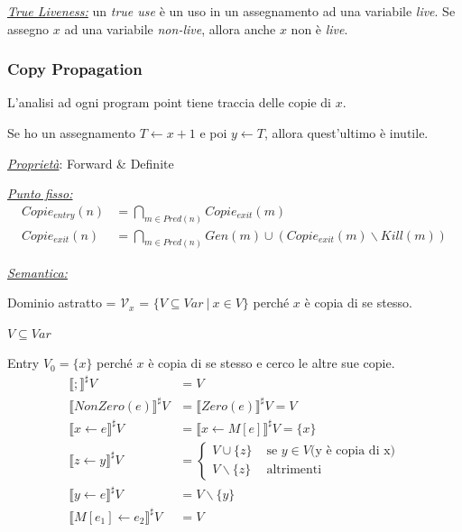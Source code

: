 \documentclass[a4paper, 11pt]{report}
\begin{document}
\noindent
\underline{\textit{True Liveness:}} un \textit{true use} è un uso in un assegnamento ad una variabile \textit{live}. Se assegno $x$ ad una variabile \textit{non-live}, allora anche $x$ non è \textit{live}.

\newpage
\subsubsection*{Copy Propagation}
L'analisi ad ogni program point tiene traccia delle copie di $x$.

\noindent
Se ho un assegnamento $T\leftarrow x+1$ e poi $y\leftarrow T$, allora quest'ultimo è inutile.
\newline

\noindent
\textit{\underline{Proprietà}}: Forward \& Definite
\newline

\noindent
\underline{\textit{Punto fisso:}}
\begin{align*}
Copie_{entry}(n) &= \bigcap_{m\in Pred(n)} Copie_{exit}(m)\\
Copie_{exit}(n) &= \bigcap_{m\in Pred(n)} Gen(m) \cup (Copie_{exit}(m)\backslash Kill(m))
\end{align*}

\noindent
\underline{\textit{Semantica:}}

Dominio astratto = $\mathcal{V}_x$ = $\{V \subseteq Var ~|~ x\in V\}$ perché $x$ è copia di se stesso.

$V\subseteq Var$

Entry $V_0=\{x\}$ perché $x$ è copia di se stesso e cerco le altre sue copie.
\begin{align*}
\llbracket ; \rrbracket^\sharp V &= V\\
\llbracket NonZero(e) \rrbracket^\sharp V &= \llbracket Zero(e) \rrbracket^\sharp V = V\\
\llbracket x\leftarrow e \rrbracket^\sharp V &= \llbracket x\leftarrow M[e]\rrbracket^\sharp V = \{x\}\\
\llbracket z\leftarrow y \rrbracket^\sharp V &=
\begin{cases}
V \cup \{z\} &\text{ se } y\in V \text{(y è copia di x)} \\
V\backslash \{z\} &\text{ altrimenti}
\end{cases}\\
\llbracket y\leftarrow e \rrbracket^\sharp V &= V\backslash \{y\}\\
\llbracket M[e_1]\leftarrow e_2 \rrbracket^\sharp V &= V
\end{align*}
\end{document}
